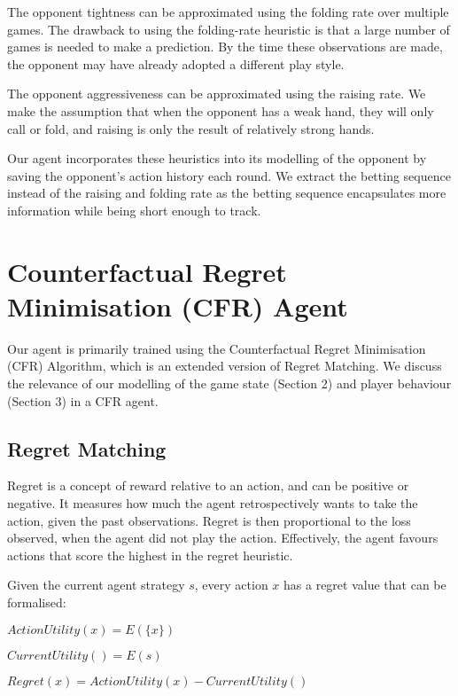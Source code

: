 \documentclass{article}
\begin{document}
The opponent tightness can be approximated using the folding rate over multiple games. The drawback to using the folding-rate heuristic is that a large number of games is needed to make a prediction. By the time these observations are made, the opponent may have already adopted a different play style.

The opponent aggressiveness can be approximated using the raising rate. We make the assumption that when the opponent has a weak hand, they will only call or fold, and raising is only the result of relatively strong hands.

Our agent incorporates these heuristics into its modelling of the opponent by saving the opponent's action history each round. We extract the betting sequence instead of the raising and folding rate as the betting sequence encapsulates more information while being short enough to track.

\section{Counterfactual Regret Minimisation (CFR) Agent}

Our agent is primarily trained using the Counterfactual Regret Minimisation (CFR) Algorithm, which is an extended version of Regret Matching. We discuss the relevance of our modelling of the game state (Section 2) and player behaviour (Section 3) in a CFR agent.

\subsection{Regret Matching}

Regret is a concept of reward relative to an action, and can be positive or negative. It measures how much the agent retrospectively wants to take the action, given the past observations. Regret is then proportional to the loss observed, when the agent did not play the action. Effectively, the agent favours actions that score the highest in the regret heuristic. 

Given the current agent strategy $s$, every action $x$ has a regret value that can be formalised:

\begin{center}
$ActionUtility(x) = E(\{x\})$

$CurrentUtility() = E(s)$

$Regret(x) = ActionUtility(x) - CurrentUtility()$
\end{center}
\end{document}

